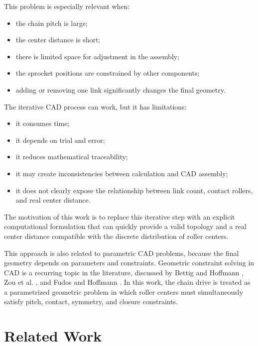 \documentclass[12pt,a4paper]{article}
\begin{document}
This problem is especially relevant when:

\begin{itemize}
    \item the chain pitch is large;
    \item the center distance is short;
    \item there is limited space for adjustment in the assembly;
    \item the sprocket positions are constrained by other components;
    \item adding or removing one link significantly changes the final geometry.
\end{itemize}

The iterative CAD process can work, but it has limitations:

\begin{itemize}
    \item it consumes time;
    \item it depends on trial and error;
    \item it reduces mathematical traceability;
    \item it may create inconsistencies between calculation and CAD assembly;
    \item it does not clearly expose the relationship between link count, contact rollers, and real center distance.
\end{itemize}

The motivation of this work is to replace this iterative step with an explicit computational formulation that can quickly provide a valid topology and a real center distance compatible with the discrete distribution of roller centers.

This approach is also related to parametric CAD problems, because the final geometry depends on parameters and constraints. Geometric constraint solving in CAD is a recurring topic in the literature, discussed by Bettig and Hoffmann \cite{bettig2011}, Zou et al. \cite{zou2022}, and Fudos and Hoffmann \cite{fudos1996}. In this work, the chain drive is treated as a parametrized geometric problem in which roller centers must simultaneously satisfy pitch, contact, symmetry, and closure constraints.

\section{Related Work}
\end{document}

